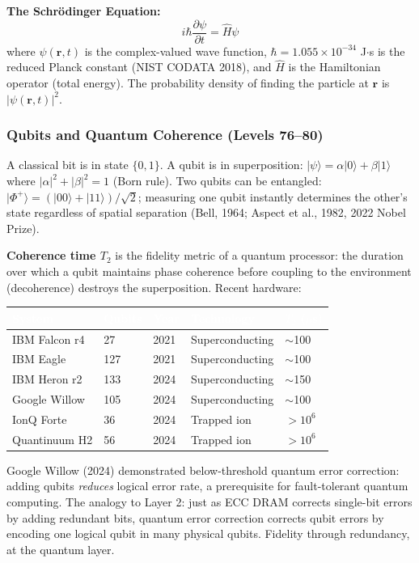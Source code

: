 \documentclass[11pt,letterpaper]{article}
\newcommand{\tableheader}[1]{\textbf{\sffamily\textcolor{white}{#1}}}
\begin{document}
\textbf{The Schr\"{o}dinger Equation:}
\[i\hbar \frac{\partial \psi}{\partial t} = \hat{H}\psi\]
where $\psi(\mathbf{r},t)$ is the complex-valued wave function, $\hbar = 1.055 \times 10^{-34}$
J$\cdot$s is the reduced Planck constant (NIST CODATA 2018), and $\hat{H}$ is the Hamiltonian
operator (total energy). The probability density of finding the particle at $\mathbf{r}$ is
$|\psi(\mathbf{r},t)|^2$.

\subsubsection{Qubits and Quantum Coherence (Levels 76--80)}

A classical bit is in state $\{0,1\}$. A qubit is in superposition: $|\psi\rangle = \alpha|0\rangle
+ \beta|1\rangle$ where $|\alpha|^2 + |\beta|^2 = 1$ (Born rule). Two qubits can be entangled:
$|\Phi^+\rangle = (|00\rangle + |11\rangle)/\sqrt{2}$; measuring one qubit instantly determines
the other's state regardless of spatial separation (Bell, 1964; Aspect et al., 1982, 2022 Nobel Prize).

\textbf{Coherence time $T_2$} is the fidelity metric of a quantum processor: the duration over
which a qubit maintains phase coherence before coupling to the environment (decoherence) destroys
the superposition. Recent hardware:

\begin{center}
\begin{tabularx}{\textwidth}{L{3cm}C{1.5cm}L{2.5cm}XC{1.8cm}}
\toprule
{}
\tableheader{System} & \tableheader{Qubits} & \tableheader{Year} & \tableheader{Technology} & \tableheader{$T_2$ ($\mu$s)} \\
\midrule
IBM Falcon r4 & 27 & 2021 & Superconducting & $\sim$100 \\
IBM Eagle & 127 & 2021 & Superconducting & $\sim$100 \\
IBM Heron r2 & 133 & 2024 & Superconducting & $\sim$150 \\
Google Willow & 105 & 2024 & Superconducting & $\sim$100 \\
IonQ Forte & 36 & 2024 & Trapped ion & $> 10^6$ \\
Quantinuum H2 & 56 & 2024 & Trapped ion & $> 10^6$ \\
\bottomrule
\end{tabularx}
\end{center}

Google Willow (2024) demonstrated below-threshold quantum error correction: adding qubits
\textit{reduces} logical error rate, a prerequisite for fault-tolerant quantum computing. The
analogy to Layer 2: just as ECC DRAM corrects single-bit errors by adding redundant bits, quantum
error correction corrects qubit errors by encoding one logical qubit in many physical qubits.
Fidelity through redundancy, at the quantum layer.
\end{document}
